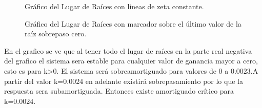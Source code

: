 \documentclass[a4paper,11pt]{article}
\begin{document}
 \begin{figure}[H] %
	\caption{Gráfico del Lugar de Raíces con lineas de zeta constante.}
	\label{fig:FTlazoc_sgrid}
\end{figure}


\begin{figure}[H] %
	\caption{Gráfico del Lugar de Raíces con marcador sobre el último valor de la raíz sobrepaso cero.}
	\label{fig:FTlazoc_rlocus_zeta1}
\end{figure} 

En el grafico se ve que al tener todo el lugar de raíces en la parte real negativa del grafico el sistema sera estable para cualquier valor de ganancia mayor a cero, esto es para k>0.
El sistema será sobreamortiguado para valores de 0 a 0.0023.A partir del valor k=0.0024 en adelante existirá sobrepasamiento por lo que la respuesta sera subamortiguada. Entonces existe amortiguado crítico para k=0.0024.\\
\end{document}
